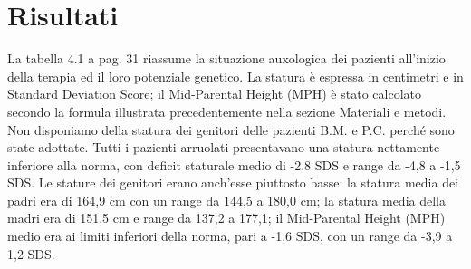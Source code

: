 \chapter{Risultati}

La tabella 4.1 a pag. 31 riassume la situazione auxologica dei pazienti all'inizio della terapia ed il loro potenziale genetico. La statura è espressa in centimetri e in Standard Deviation Score; il Mid-Parental Height (MPH) è stato calcolato secondo la formula illustrata precedentemente nella sezione Materiali e metodi. Non disponiamo della statura dei genitori delle pazienti B.M. e P.C. perché sono state adottate. Tutti i pazienti arruolati presentavano una statura nettamente inferiore alla norma, con deficit staturale medio di -2,8 SDS e range da -4,8 a -1,5 SDS. Le stature dei genitori erano anch'esse piuttosto basse: la statura media dei padri era di 164,9 cm con un range da 144,5 a 180,0 cm; la statura media della madri era di 151,5 cm e range da 137,2 a 177,1; il Mid-Parental Height (MPH) medio era ai limiti inferiori della norma, pari a -1,6 SDS, con un range da -3,9 a 1,2 SDS.

